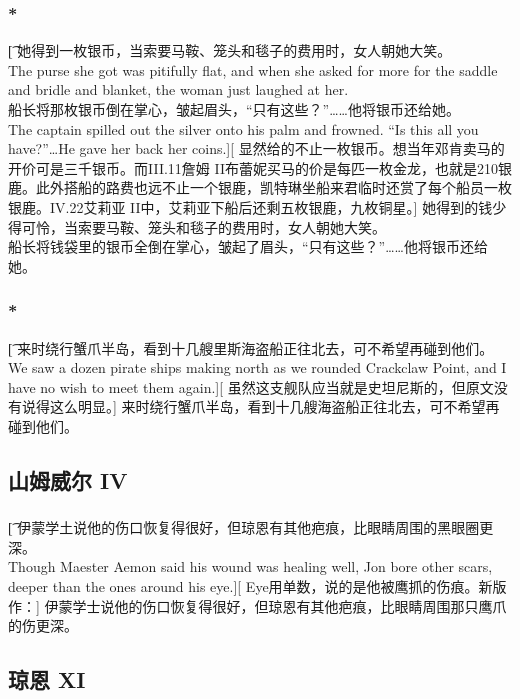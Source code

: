 \documentclass[12pt,a4paper]{article}
\begin{document}
\subsubsection{\color{red}*}\t[
	她得到一枚银币，当索要马鞍、笼头和毯子的费用时，女人朝她大笑。\\
	The purse she got was pitifully flat, and when she asked for more for the saddle and bridle and blanket, the woman just laughed at her.\\
	船长将那枚银币倒在掌心，皱起眉头，“只有这些？”……他将银币还给她。\\
	The captain spilled out the silver onto his palm and frowned. “Is this all you have?”\ldots He gave her back her coins.][
	显然给的不止一枚银币。想当年邓肯卖马的开价可是三千银币。而III.11詹姆 II布蕾妮买马的价是每匹一枚金龙，也就是210银鹿。此外搭船的路费也远不止一个银鹿，凯特琳坐船来君临时还赏了每个船员一枚银鹿。IV.22艾莉亚 II中，艾莉亚下船后还剩五枚银鹿，九枚铜星。]
	她得到的钱少得可怜，当索要马鞍、笼头和毯子的费用时，女人朝她大笑。\\
	船长将钱袋里的银币全倒在掌心，皱起了眉头，“只有这些？”……他将银币还给她。
	
\subsubsection{\color{red}*}\t[
	来时绕行蟹爪半岛，看到十几艘里斯海盗船正往北去，可不希望再碰到他们。\\
	We saw a dozen pirate ships making north as we rounded Crackclaw Point, and I have no wish to meet them again.][
	虽然这支舰队应当就是史坦尼斯的，但原文没有说得这么明显。]
	来时绕行蟹爪半岛，看到十几艘海盗船正往北去，可不希望再碰到他们。
	
\subsection{山姆威尔 IV}
\subsubsection{}\t[
	伊蒙学土说他的伤口恢复得很好，但琼恩有其他疤痕，比眼睛周围的黑眼圈更深。\\
	Though Maester Aemon said his wound was healing well, Jon bore other scars, deeper than the ones around his eye.][
	Eye用单数，说的是他被鹰抓的伤痕。新版作：]
	伊蒙学士说他的伤口恢复得很好，但琼恩有其他疤痕，比眼睛周围那只鹰爪的伤更深。
	
\subsection{琼恩 XI}
\end{document}
